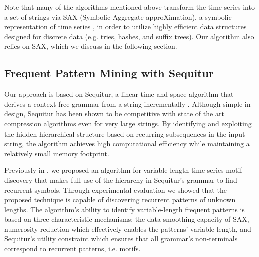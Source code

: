 \documentclass{llncs}
\begin{document}
Note that many of the algorithms mentioned above \cite{hot_sax, viztree, bitmaps, haar_1, haar_2} transform the time series into a set of strings via SAX (Symbolic Aggregate approXimation), a symbolic representation of time series \cite{sax}, in order to utilize highly efficient data structures designed for discrete data (e.g. tries, hashes, and suffix trees). Our algorithm also relies on SAX, which we discuss in the following section.

\subsection{Frequent Pattern Mining with Sequitur}
Our approach is based on Sequitur, a linear time and space algorithm that derives a context-free grammar from a string incrementally \cite{sequitur}. Although simple in design, Sequitur has been shown to be competitive with state of the art compression algorithms even for very large strings. By identifying and exploiting the hidden hierarchical structure based on recurring subsequences in the input string, the algorithm achieves high computational efficiency while maintaining a relatively small memory footprint. 


Previously in \cite{grammarviz}, we proposed an algorithm for variable-length time series motif discovery that makes full use of the hierarchy in Sequitur's grammar to find recurrent symbols. Through experimental evaluation we showed that the proposed technique is capable of discovering recurrent patterns of unknown lengths. The algorithm's ability to identify variable-length frequent patterns is based on three characteristic mechanisms: the data smoothing capacity of SAX,  numerosity reduction which effectively enables the patterns' variable length, and Sequitur's utility constraint which ensures that all grammar's non-terminals correspond to recurrent patterns, i.e. motifs.
\end{document}
